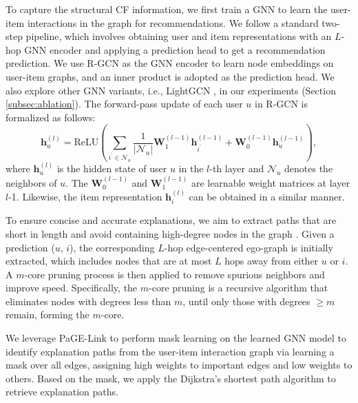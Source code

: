  To capture the structural CF information, we first train a GNN to learn the user-item interactions in the graph for recommendations. We follow a standard two-step pipeline, which involves obtaining user and item representations with an $L$-hop GNN encoder and applying a prediction head to get a recommendation prediction. We use R-GCN \cite{schlichtkrull2018modeling} as the GNN encoder to learn node embeddings on user-item graphs, and an inner product is adopted as the prediction head. We also explore other GNN variants, i.e., LightGCN \cite{he2020lightgcn}, in our experiments (Section \ref{subsec:ablation}). The forward-pass update of each user $u$ in R-GCN is formalized as follows:
\begin{equation}
    \mathbf{h}_u^{(l)} = \text{ReLU} \left( \sum_{i^\prime \in \mathcal{N}_u} \frac{1}{|\mathcal{N}_u|} \mathbf{W}_1^{(l-1)} \mathbf{h}_{i^\prime}^{(l-1)} + \mathbf{W}_0^{(l-1)} \mathbf{h}_u^{(l-1)} \right), 
\end{equation}
\noindent where {\small$\mathbf{h}_u^{(l)}$} is the hidden state of user $u$ in the $l$-th layer and $\mathcal{N}_u$ denotes the neighbors of $u$. The {\small $\mathbf{W}_0^{(l-1)}$} and {\small$\mathbf{W}_1^{(l-1)}$} are learnable weight matrices at layer $l$-1. Likewise, the item representation {\small$\mathbf{h}_i^{(l)}$} can be obtained in a similar manner.


 To ensure concise and accurate explanations, we aim to extract paths that are short in length and avoid containing high-degree nodes in the graph \cite{zhang2023page}. Given a prediction ($u$, $i$), the corresponding $L$-hop edge-centered ego-graph is initially extracted, which includes nodes that are at most $L$ hops away from either $u$ or $i$. A $m$-core pruning process is then applied to remove spurious neighbors and improve speed. Specifically, the $m$-core pruning is a recursive algorithm that eliminates nodes with degrees less than $m$, until only those with degrees $\geq m$ remain, forming the $m$-core. 

 We leverage PaGE-Link \cite{zhang2023page} to perform mask learning on the learned GNN model to identify explanation paths from the user-item interaction graph via learning a mask over all edges, assigning high weights to important edges and low weights to others. Based on the mask, we apply the Dijkstra's shortest path algorithm \cite{dijkstra2022note} to retrieve explanation paths.

